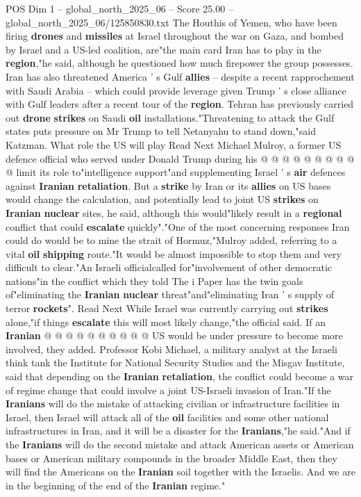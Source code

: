 \begin{textsample}{POS Dim 1 – global\_north\_2025\_06 – Score 25.00 – global\_north\_2025\_06/125850830.txt}
The Houthis of Yemen, who have been firing \textbf{drones} and \textbf{missiles} at Israel throughout the war on Gaza, and bombed by Israel and a US-led coalition, are"the main card Iran has to play in the \textbf{region},"he said, although he questioned how much firepower the group possesses.
Iran has also threatened America ' s Gulf \textbf{allies} -- despite a recent rapprochement with Saudi Arabia -- which could provide leverage given Trump ' s close alliance with Gulf leaders after a recent tour of the \textbf{region}.
Tehran has previously carried out \textbf{drone} \textbf{strikes} on Saudi \textbf{oil} installations."Threatening to attack the Gulf states puts pressure on Mr Trump to tell Netanyahu to stand down,"said Katzman.
What role the US will play Read Next Michael Mulroy, a former US defence official who served under Donald Trump during his @ @ @ @ @ @ @ @ @ @ limit its role to"intelligence support"and supplementing Israel ' s \textbf{air} defences against \textbf{Iranian} \textbf{retaliation}.
But a \textbf{strike} by Iran or its \textbf{allies} on US bases would change the calculation, and potentially lead to joint US \textbf{strikes} on \textbf{Iranian} \textbf{nuclear} sites, he said, although this would"likely result in a \textbf{regional} conflict that could \textbf{escalate} quickly"."One of the most concerning responses Iran could do would be to mine the strait of Hormuz,"Mulroy added, referring to a vital \textbf{oil} \textbf{shipping} route."It would be almost impossible to stop them and very difficult to clear."An Israeli officialcalled for"involvement of other democratic nations"in the conflict which they told The i Paper has the twin goals of"eliminating the \textbf{Iranian} \textbf{nuclear} threat"and"eliminating Iran ' s supply of terror \textbf{rockets}".
Read Next While Israel was currently carrying out \textbf{strikes} alone,"if things \textbf{escalate} this will most likely change,"the official said.
If an \textbf{Iranian} @ @ @ @ @ @ @ @ @ @ US would be under pressure to become more involved, they added.
Professor Kobi Michael, a military analyst at the Israeli think tank the Institute for National Security Studies and the Misgav Institute, said that depending on the \textbf{Iranian} \textbf{retaliation}, the conflict could become a war of regime change that could involve a joint US-Israeli invasion of Iran."If the \textbf{Iranians} will do the mistake of attacking civilian or infrastructure facilities in Israel, then Israel will attack all of the \textbf{oil} facilities and some other national infrastructures in Iran, and it will be a disaster for the \textbf{Iranians},"he said."And if the \textbf{Iranians} will do the second mistake and attack American assets or American bases or American military compounds in the broader Middle East, then they will find the Americans on the \textbf{Iranian} soil together with the Israelis.
And we are in the beginning of the end of the \textbf{Iranian} regime."

\end{textsample}
